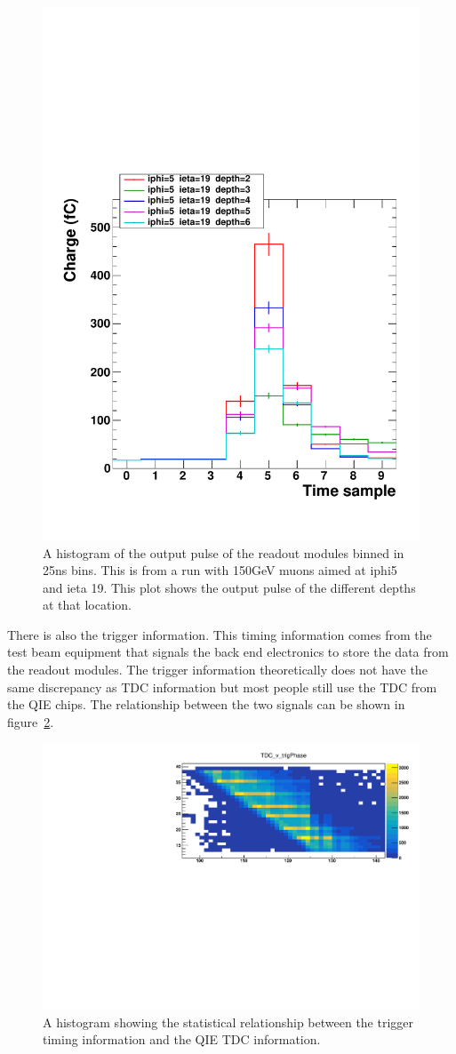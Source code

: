 \begin{figure}
\centering
\includegraphics[width=0.7\linewidth]{Figures/Pulse.pdf}
\caption{A histogram of the output pulse of the readout modules binned in 25ns bins. This is from a run with 150GeV muons aimed at iphi5 and ieta 19. This plot shows the output pulse of the different depths at that location.}
\label{fig:PulSh}
\end{figure}

There is also the trigger information. This timing information comes from the test beam equipment that signals the back end electronics to store the data from the readout modules. The trigger information theoretically does not have the same discrepancy as TDC information but most people still use the TDC from the QIE chips. The relationship between the two signals can be shown in figure~\ref{fig:tdc}.

\begin{figure}
\centering
\includegraphics[width=\linewidth]{Figures/zoom.pdf}
\caption{A histogram showing the statistical relationship between the trigger timing information and the QIE TDC information.}
\label{fig:tdc}
\end{figure}


